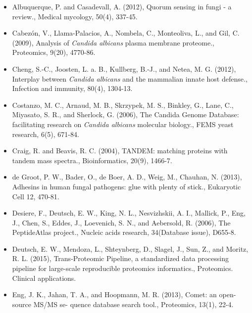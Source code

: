 \begin{itemize}[leftmargin=*]


\item[]{%
Albuquerque, P. and Casadevall, A. (2012), Quorum sensing in fungi - a review.,
Medical mycology, 50(4), 337-45.
}

\item[]{%
Cabez\'on, V., Llama-Palacios, A., Nombela, C., Monteoliva, L., and Gil, C. (2009), Analysis of
\textit{Candida albicans} plasma membrane proteome., Proteomics, 9(20), 4770-86.
}


\item[]{%
Cheng, S.-C., Joosten, L. a. B., Kullberg, B.-J., and Netea, M. G. (2012), Interplay between
\textit{Candida albicans} and the mammalian innate host defense., Infection and immunity, 80(4),
1304-13.
}

\item[]{%
Costanzo, M. C., Arnaud, M. B., Skrzypek, M. S., Binkley, G., Lane, C., Miyasato, S. R., and
Sherlock, G. (2006), The Candida Genome Database: facilitating research on 
\textit{Candida albicans} molecular biology., FEMS yeast research, 6(5), 671-84.
}

\item[]{%
Craig, R. and Beavis, R. C. (2004), TANDEM: matching proteins with tandem mass spectra.,
Bioinformatics, 20(9), 1466-7.
}

\item[]{
de Groot, P. W., Bader, O., de Boer, A. D., Weig, M., Chauhan, N. (2013),
Adhesins in human fungal pathogens: glue with plenty of stick., 
Eukaryotic Cell 12, 470-81.
}

\item[]{%
Desiere, F., Deutsch, E. W., King, N. L., Nesvizhskii, A. I., Mallick, P., Eng, J., Chen, S., Eddes,
J., Loevenich, S. N., and Aebersold, R. (2006), The PeptideAtlas project., Nucleic acids
research, 34(Database issue), D655-8.
}

\item[]{%
Deutsch, E. W., Mendoza, L., Shteynberg, D., Slagel, J., Sun, Z., and Moritz, R. L. (2015),
Trans-Proteomic Pipeline, a standardized data processing pipeline for large-scale 
reproducible proteomics informatics., Proteomics. Clinical applications.
}

\item[]{%
Eng, J. K., Jahan, T. A., and Hoopmann, M. R. (2013), Comet: an open-source MS/MS se-
quence database search tool., Proteomics, 13(1), 22-4.
}


\end{itemize}
